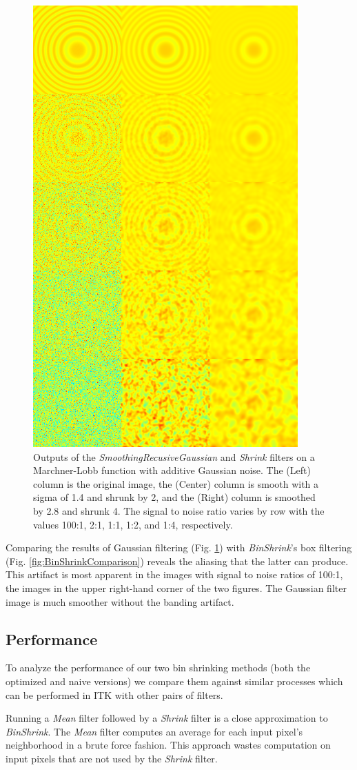 \documentclass{InsightArticle}
\begin{document}
\begin{figure}
  \centering
  \includegraphics[width=0.4\linewidth]{images/gaussianshrink_hot.png}
  \caption{Outputs of the \textit{SmoothingRecusiveGaussian} and
    \textit{Shrink} filters on a Marchner-Lobb function with additive
    Gaussian noise. The (Left) column is the original image, the
    (Center) column is smooth with a sigma of 1.4 and shrunk by 2, and
    the (Right) column is smoothed by 2.8 and shrunk 4. The signal to
    noise ratio varies by row with the values 100:1, 2:1, 1:1, 1:2,
    and 1:4, respectively.}
  \label{fig:GaussianShrinkComparison}
\end{figure}


Comparing the results of Gaussian filtering (Fig. \ref{fig:GaussianShrinkComparison})
  with \textit{BinShrink}'s box filtering (Fig.  \ref{fig:BinShrinkComparison})
reveals the aliasing that the latter can produce.
This artifact is most apparent in the images with signal to noise ratios of 100:1, the
images in the upper right-hand corner of the two figures.  The Gaussian filter image is much smoother without the banding artifact.


\subsection{Performance}

To analyze the performance of our two bin shrinking methods (both the optimized and naive
  versions) we compare them
against similar processes which can be performed in ITK with other pairs of filters.

Running a \textit{Mean} filter followed by a \textit{Shrink} filter is a
close approximation to \textit{BinShrink}. The
\textit{Mean} filter computes an average for each input pixel's
neighborhood in a brute force fashion. This approach wastes computation on input
pixels that are not used by the \textit{Shrink} filter.
\end{document}
